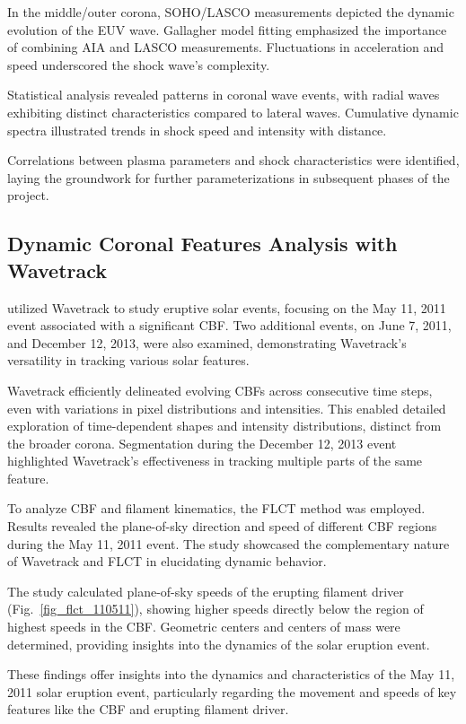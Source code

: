 In the middle/outer corona, SOHO/LASCO measurements depicted the dynamic evolution of the EUV wave. Gallagher model fitting emphasized the importance of combining AIA and LASCO measurements. Fluctuations in acceleration and speed underscored the shock wave's complexity.

Statistical analysis revealed patterns in coronal wave events, with radial waves exhibiting distinct characteristics compared to lateral waves. Cumulative dynamic spectra illustrated trends in shock speed and intensity with distance.

Correlations between plasma parameters and shock characteristics were identified, laying the groundwork for further parameterizations in subsequent phases of the project.

\subsection{Dynamic Coronal Features Analysis with Wavetrack}
\citet{stepanyuk_2022} utilized Wavetrack to study eruptive solar events, focusing on the May 11, 2011 event associated with a significant CBF. Two additional events, on June 7, 2011, and December 12, 2013, were also examined, demonstrating Wavetrack's versatility in tracking various solar features.

Wavetrack efficiently delineated evolving CBFs across consecutive time steps, even with variations in pixel distributions and intensities. This enabled detailed exploration of time-dependent shapes and intensity distributions, distinct from the broader corona. Segmentation during the December 12, 2013 event highlighted Wavetrack's effectiveness in tracking multiple parts of the same feature.

To analyze CBF and filament kinematics, the FLCT method was employed. Results revealed the plane-of-sky direction and speed of different CBF regions during the May 11, 2011 event. The study showcased the complementary nature of Wavetrack and FLCT in elucidating dynamic behavior.

The study calculated plane-of-sky speeds of the erupting filament driver (Fig.~\ref{fig_flct_110511}), showing higher speeds directly below the region of highest speeds in the CBF. Geometric centers and centers of mass were determined, providing insights into the dynamics of the solar eruption event.

These findings offer insights into the dynamics and characteristics of the May 11, 2011 solar eruption event, particularly regarding the movement and speeds of key features like the CBF and erupting filament driver.

